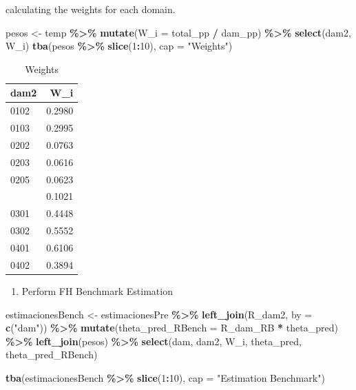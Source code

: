 \documentclass[
  12pt,
]{book}
\newenvironment{Shaded}{\begin{snugshade}}{\end{snugshade}}
\newcommand{\AttributeTok}[1]{\textcolor[rgb]{0.13,0.29,0.53}{#1}}
\newcommand{\DecValTok}[1]{\textcolor[rgb]{0.00,0.00,0.81}{#1}}
\newcommand{\FunctionTok}[1]{\textcolor[rgb]{0.13,0.29,0.53}{\textbf{#1}}}
\newcommand{\NormalTok}[1]{#1}
\newcommand{\OtherTok}[1]{\textcolor[rgb]{0.56,0.35,0.01}{#1}}
\newcommand{\SpecialCharTok}[1]{\textcolor[rgb]{0.81,0.36,0.00}{\textbf{#1}}}
\newcommand{\StringTok}[1]{\textcolor[rgb]{0.31,0.60,0.02}{#1}}
\providecommand{\tightlist}{%
  \setlength{\itemsep}{0pt}\setlength{\parskip}{0pt}}
\begin{document}
calculating the weights for each domain.

\begin{Shaded}
\begin{Highlighting}[]
\NormalTok{pesos }\OtherTok{\textless{}{-}}\NormalTok{ temp }\SpecialCharTok{\%\textgreater{}\%} 
  \FunctionTok{mutate}\NormalTok{(}\AttributeTok{W\_i =}\NormalTok{ total\_pp }\SpecialCharTok{/}\NormalTok{ dam\_pp) }\SpecialCharTok{\%\textgreater{}\%} 
  \FunctionTok{select}\NormalTok{(dam2, W\_i)}
\FunctionTok{tba}\NormalTok{(pesos }\SpecialCharTok{\%\textgreater{}\%} \FunctionTok{slice}\NormalTok{(}\DecValTok{1}\SpecialCharTok{:}\DecValTok{10}\NormalTok{), }\AttributeTok{cap =} \StringTok{"Weights"}\NormalTok{)}
\end{Highlighting}
\end{Shaded}

\begin{table}[H]

\caption{\label{tab:unnamed-chunk-22}Weights}
\centering
\begin{tabular}[t]{lr}
\toprule
dam2 & W\_i\\
\midrule
0102 & 0.2980\\
0103 & 0.2995\\
0202 & 0.0763\\
0203 & 0.0616\\
0205 & 0.0623\\
\addlinespace
0212 & 0.1021\\
0301 & 0.4448\\
0302 & 0.5552\\
0401 & 0.6106\\
0402 & 0.3894\\
\bottomrule
\end{tabular}
\end{table}

\begin{enumerate}
\def\labelenumi{\arabic{enumi}.}
\setcounter{enumi}{4}
\tightlist
\item
  Perform FH Benchmark Estimation
\end{enumerate}

\begin{Shaded}
\begin{Highlighting}[]
\NormalTok{estimacionesBench }\OtherTok{\textless{}{-}}\NormalTok{ estimacionesPre }\SpecialCharTok{\%\textgreater{}\%}
  \FunctionTok{left\_join}\NormalTok{(R\_dam2, }\AttributeTok{by =} \FunctionTok{c}\NormalTok{(}\StringTok{"dam"}\NormalTok{)) }\SpecialCharTok{\%\textgreater{}\%}
  \FunctionTok{mutate}\NormalTok{(}\AttributeTok{theta\_pred\_RBench =}\NormalTok{ R\_dam\_RB }\SpecialCharTok{*}\NormalTok{ theta\_pred) }\SpecialCharTok{\%\textgreater{}\%}
  \FunctionTok{left\_join}\NormalTok{(pesos) }\SpecialCharTok{\%\textgreater{}\%} 
  \FunctionTok{select}\NormalTok{(dam, dam2, W\_i, theta\_pred, theta\_pred\_RBench)  }

  \FunctionTok{tba}\NormalTok{(estimacionesBench }\SpecialCharTok{\%\textgreater{}\%} \FunctionTok{slice}\NormalTok{(}\DecValTok{1}\SpecialCharTok{:}\DecValTok{10}\NormalTok{), }\AttributeTok{cap =} \StringTok{"Estimation Benchmark"}\NormalTok{)}
\end{Highlighting}
\end{Shaded}
\end{document}
